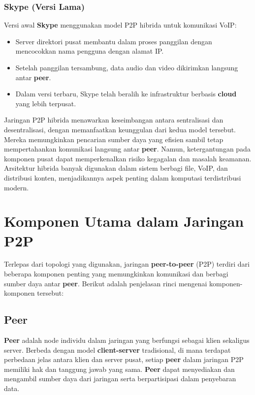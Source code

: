 \subsubsection{Skype (Versi Lama)}
Versi awal \textbf{Skype} menggunakan model P2P hibrida untuk komunikasi VoIP:
\begin{itemize}
	\item Server direktori pusat membantu dalam proses panggilan dengan mencocokkan nama pengguna dengan alamat IP.
	\item Setelah panggilan tersambung, data audio dan video dikirimkan langsung antar \textbf{peer}.
	\item Dalam versi terbaru, Skype telah beralih ke infrastruktur berbasis \textbf{cloud} yang lebih terpusat.
\end{itemize}

Jaringan P2P hibrida menawarkan keseimbangan antara sentralisasi dan desentralisasi, dengan memanfaatkan keunggulan dari kedua model tersebut. Mereka memungkinkan pencarian sumber daya yang efisien sambil tetap mempertahankan komunikasi langsung antar \textbf{peer}. Namun, ketergantungan pada komponen pusat dapat memperkenalkan risiko kegagalan dan masalah keamanan. Arsitektur hibrida banyak digunakan dalam sistem berbagi file, VoIP, dan distribusi konten, menjadikannya aspek penting dalam komputasi terdistribusi modern.


\section{Komponen Utama dalam Jaringan P2P}

Terlepas dari topologi yang digunakan, jaringan \textbf{peer-to-peer} (P2P) terdiri dari beberapa komponen penting yang memungkinkan komunikasi dan berbagi sumber daya antar \textbf{peer}. Berikut adalah penjelasan rinci mengenai komponen-komponen tersebut:

\subsection{Peer}
\textbf{Peer} adalah node individu dalam jaringan yang berfungsi sebagai klien sekaligus server. Berbeda dengan model \textbf{client-server} tradisional, di mana terdapat perbedaan jelas antara klien dan server pusat, setiap \textbf{peer} dalam jaringan P2P memiliki hak dan tanggung jawab yang sama. \textbf{Peer} dapat menyediakan dan mengambil sumber daya dari jaringan serta berpartisipasi dalam penyebaran data.

